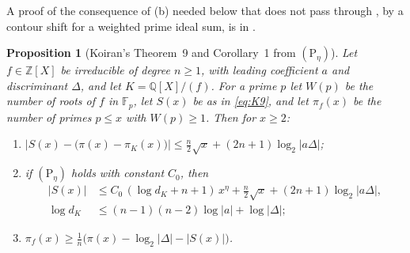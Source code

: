 \documentclass[11pt]{amsart}
\newtheorem{proposition}[thm]{Proposition}
\theoremstyle{definition}
\theoremstyle{remark}
\newcommand{\Z}{\mathbb Z}
\newcommand{\Q}{\mathbb Q}
\newcommand{\F}{\mathbb F}
\newcommand{\Ph}[1]{(\mathrm P_{#1})}
\begin{document}
A proof of the consequence of (b) needed below that does not pass through \cite{FSW}, by a contour shift for a weighted prime ideal sum, is in \cite[proof of Proposition~17.2]{N}.

\begin{proposition}[Koiran's Theorem~9 and Corollary~1 from $\Ph\eta$]\label{prop:K9}
Let $f\in\Z[X]$ be irreducible of degree $n\ge1$, with leading coefficient $a$ and discriminant $\Delta$, and let $K=\Q[X]/(f)$. For a prime $p$ let $W(p)$ be the number of roots of $f$ in $\F_p$, let $S(x)$ be as in \eqref{eq:K9}, and let $\pi_f(x)$ be the number of primes $p\le x$ with $W(p)\ge1$. Then for $x\ge2$:
\begin{enumerate}
\item $\bigl|S(x)-\bigl(\pi(x)-\pi_K(x)\bigr)\bigr|\le\frac n2\sqrt x+(2n+1)\log_2|a\Delta|$;
\item if $\Ph\eta$ holds with constant $C_0$, then
\begin{align*}
 |S(x)|&\le C_0\,(\log d_K+n+1)\,x^{\eta}+\tfrac n2\sqrt x+(2n+1)\log_2|a\Delta|,\\
 \log d_K&\le(n-1)(n-2)\log|a|+\log|\Delta|;
\end{align*}
\item $\pi_f(x)\ge\frac1n\bigl(\pi(x)-\log_2|\Delta|-|S(x)|\bigr)$.
\end{enumerate}
\end{proposition}
\end{document}
